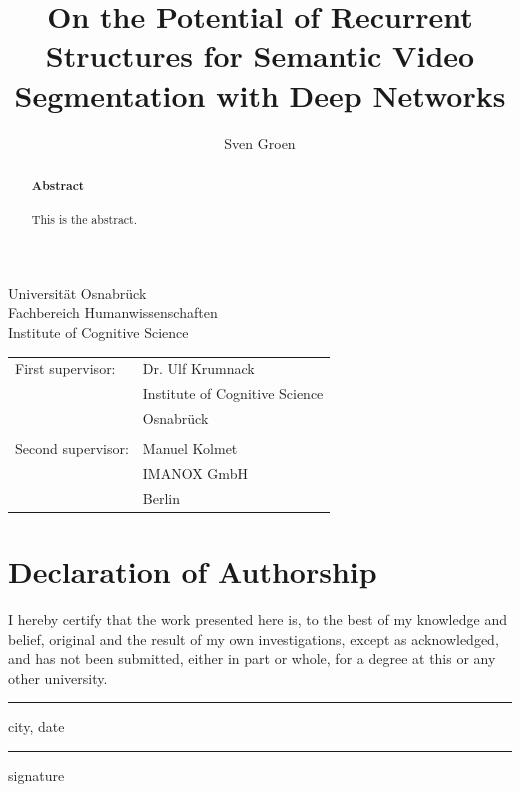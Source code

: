 \documentclass[11pt,
  paper=a4, 
  bibliography=totocnumbered,
	captions=tableheading,
	BCOR=10mm
]{scrreprt}
\title{On the Potential of Recurrent Structures for Semantic Video Segmentation with Deep Networks}
\author{Sven Groen}
\theoremstyle{definition}
\newcommand{\namesigdate}[1][5cm]{%
	\vspace{5cm}
	{\setlength{\parindent}{0cm}
	\begin{minipage}{0.3\textwidth}
		\hrule 
		\vspace{0.5cm}
		{\small city, date}
	\end{minipage}
	 \hfill
	\begin{minipage}{0.3\textwidth}
		\hrule
		\vspace{0.5cm}
	    {\small signature}
	\end{minipage}
	}
}
\begin{document}
\begin{titlepage}
	\begin{flushleft}
		Universität Osnabrück\\
		Fachbereich Humanwissenschaften\\
		Institute of Cognitive Science
	\end{flushleft}

	\vspace{2cm}
	\vspace{1cm}

	\begin{tabular}{ll}
		First supervisor:  & Dr. Ulf Krumnack          \\
		                   & Institute of Cognitive Science            \\
		                   & Osnabrück                \\\\
		Second supervisor: & Manuel Kolmet         \\
		                   & IMANOX GmbH  \\
		                   & Berlin 
	\end{tabular}

\end{titlepage}


\chapter*{Declaration of Authorship}
I hereby certify that the work presented here is, to the best of my knowledge and belief, original and the result of my own investigations, except as acknowledged, and has not been submitted, either in part or whole, for a degree at this or any other university.

\namesigdate
{}
\pagebreak

\begin{abstract}
	\textbf{\LARGE{Abstract}}\\\\
	This is the abstract.
\end{abstract}
\end{document}
